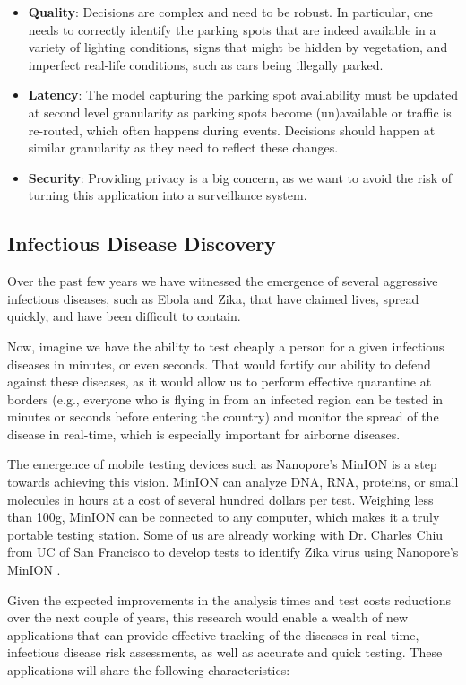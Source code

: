 \begin{itemize}[noitemsep,topsep=0pt,parsep=0pt,partopsep=0pt]
\item {\bf Quality}: Decisions are complex and need to be robust. In particular, one needs to correctly identify the parking spots that are indeed available in a variety of lighting conditions, signs that might be hidden by vegetation, and imperfect real-life conditions, such as cars being illegally parked.
\item {\bf Latency}: The model capturing the parking spot availability must be updated at second level granularity as parking spots become (un)available or traffic is re-routed, which often happens during events. Decisions should happen at similar granularity as they need to reflect these changes.
\item {\bf Security}: Providing privacy is a big concern, as we want to avoid the risk of turning this application into a surveillance system.
\end{itemize}

\subsection{Infectious Disease Discovery}

Over the past few years we have witnessed the emergence of several aggressive infectious diseases, such as Ebola and Zika, that have claimed lives, spread quickly, and have been difficult to contain. 

Now, imagine  we have the ability to test cheaply a person for a given infectious diseases in minutes, or even seconds. That would fortify our ability to defend against these diseases, as it would allow us to perform effective quarantine at borders (e.g., everyone who is flying in from an infected region can be tested in minutes or seconds before entering the country) and monitor the spread of the disease in real-time, which is especially important for airborne diseases.

The emergence of mobile testing devices such as Nanopore's MinION is a step towards achieving this vision. MinION can analyze DNA, RNA, proteins, or small molecules in hours at a cost of several hundred dollars per test. Weighing less than 100g, MinION can be connected to any computer, which makes it a truly portable testing station. Some of us are already working with Dr. Charles Chiu from UC of San Francisco to develop tests to identify Zika virus using Nanopore's MinION . 

Given the expected improvements in the analysis times and test costs reductions over the next couple of years, this research would enable a wealth of new applications that can provide effective tracking of the diseases in real-time, infectious disease risk assessments, as well as accurate and quick testing. These applications will share the following characteristics:

